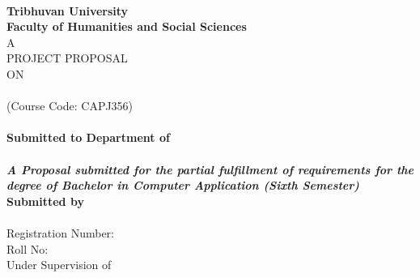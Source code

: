 \begin{titlepage}
\thispagestyle{empty}
\centering
\singlespacing

\\[10pt]
{\fontsize{16}{20}\selectfont\bfseries Tribhuvan University}\\[4pt]
{\fontsize{14}{17}\selectfont\bfseries Faculty of Humanities and Social Sciences}\\[16pt]

{\fontsize{12}{15}\selectfont A}\\[4pt]
{\fontsize{14}{17}\selectfont PROJECT PROPOSAL}\\[4pt]
{\fontsize{12}{15}\selectfont ON}\\[8pt]
{\fontsize{14}{17}\selectfont\bfseries \MakeUppercase{\ProjectTitle}}\\[4pt]
{\fontsize{12}{15}\selectfont (Course Code: CAPJ356)}\\[10pt]

\\[12pt]

{\fontsize{14}{17}\selectfont\bfseries Submitted to Department of \DepartmentName}\\[4pt]
{\fontsize{14}{17}\selectfont\bfseries \CollegeName}\\[8pt]
{\fontsize{12}{15}\selectfont\textbf{\textit{A Proposal submitted for the partial fulfillment of requirements for the degree of Bachelor in Computer Application (Sixth Semester)}}}\\[14pt]

{\fontsize{12}{15}\selectfont\bfseries Submitted by}\\[4pt]
{\fontsize{12}{15}\selectfont \StudentName\\ Registration Number: \RegNo\\ Roll No: \RollNo}\\[14pt]

{\fontsize{12}{15}\selectfont Under Supervision of}\\[4pt]
{\fontsize{12}{15}\selectfont \SupervisorName}\\[14pt]

{\fontsize{12}{15}\selectfont \SubmissionDate}
\end{titlepage}
